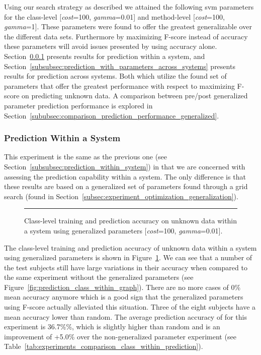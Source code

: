 Using our search strategy as described we attained the following \gls{svm} parameters for the class-level [\emph{cost}=100, \emph{gamma}=0.01] and method-level [\emph{cost}=100, \emph{gamma}=1]. These parameters were found to offer the greatest generalizable over the different data sets. Furthermore by maximizing F-score instead of accuracy these parameters will avoid issues presented by using accuracy alone. Section~\ref{subsubsec:prediction_with_parameters_within_system} presents results for prediction within a system, and Section~\ref{subsubsec:prediction_with_parameters_across_systems} presents results for prediction across systems. Both which utilize the found set of parameters that offer the greatest performance with respect to maximizing F-score on predicting unknown data. A comparison between pre/post generalized parameter prediction performance is explored in Section~\ref{sububsec:comparison_prediction_performance_generalized}.


\subsubsection{Prediction Within a System}
\label{subsubsec:prediction_with_parameters_within_system}
This experiment is the same as the previous one (see Section~\ref{subsubsec:prediction_within_system}) in that we are concerned with assessing the prediction capability within a system. The only difference is that these results are based on a generalized set of parameters found through a grid search (found in Section~\ref{subsec:experiment_optimization_generalization}).

\begin{figure}[!tb]
  \centering
  \begin{adjustbox}{max size={\textwidth}{\textheight}}
    
  \end{adjustbox}
  \caption{Class-level training and prediction accuracy on unknown data within a system using generalized parameters [\emph{cost}=100, \emph{gamma}=0.01].}
  \vspace{2mm}
  \hrule
  \label{fig:prediction_with_parameters_class_within_graph}
\end{figure}

The class-level training and prediction accuracy of unknown data within a system using generalized parameters is shown in Figure~\ref{fig:prediction_with_parameters_class_within_graph}. We can see that a number of the test subjects still have large variations in their accuracy when compared to the same experiment without the generalized parameters (see Figure~\ref{fig:prediction_class_within_graph}). There are no more cases of 0\% mean accuracy anymore which is a good sign that the generalized parameters using F-score actually alleviated this situation. Three of the eight subjects have a mean accuracy lower than random. The average prediction accuracy of for this experiment is 36.7\%\%, which is slightly higher than random and is an improvement of +5.0\% over the non-generalized parameter experiment (see Table~\ref{tab:experiments_comparison_class_within_prediction}).

